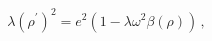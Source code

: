 \begin{equation}
\label{constrain1}
\lambda (\rho^\prime)^2 = e^2 \left(1 - \lambda \omega^2 \beta(\rho) \right)\,,
\end{equation}

